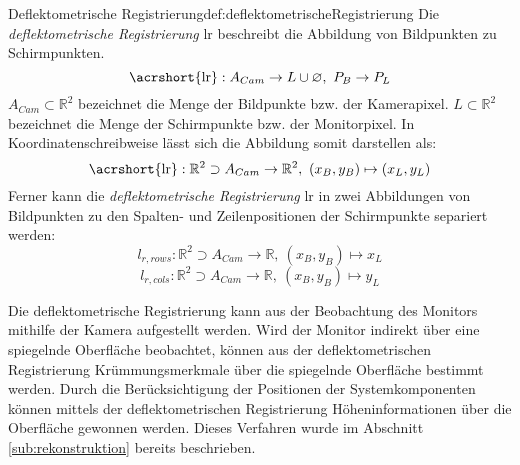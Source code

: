 \begin{Definition}{Deflektometrische Registrierung}{def:deflektometrischeRegistrierung}
	Die \textit{deflektometrische Registrierung} \acrshort{lr} beschreibt die Abbildung von Bildpunkten zu Schirmpunkten. \cite{kit_sbw}
	\begin{equation}
		\text{\acrshort{lr}} : A_{Cam} \rightarrow L \cup \varnothing ,~ P_{B} \rightarrow P_{L}
	\end{equation}
	$ A_{Cam} \subset \mathbb{R}^{2} $ bezeichnet die Menge der Bildpunkte bzw. der Kamerapixel.
	$ L \subset \mathbb{R}^{2} $ bezeichnet die Menge der Schirmpunkte bzw. der Monitorpixel.
	In Koordinatenschreibweise lässt sich die Abbildung somit darstellen als:
	\begin{equation}
		\text{\acrshort{lr}} : \mathbb{R}^{2} \supset A_{Cam} \rightarrow \mathbb{R}^2 ,~ (x_{B}, y_{B}) \mapsto (x_{L}, y_{L})
	\end{equation}
	Ferner kann die \textit{deflektometrische Registrierung} \acrshort{lr} in zwei Abbildungen von Bildpunkten zu den Spalten- und Zeilenpositionen der Schirmpunkte separiert werden:
	\begin{equation}
		l_{r,rows} : \mathbb{R}^{2} \supset A_{Cam} \rightarrow \mathbb{R} ,~ (x_{B}, y_{B}) \mapsto x_{L}
	\end{equation}
	\begin{equation}
		l_{r,cols} : \mathbb{R}^{2} \supset A_{Cam} \rightarrow \mathbb{R} ,~ (x_{B}, y_{B}) \mapsto y_{L}
	\end{equation}
\end{Definition}

\noindent
Die deflektometrische Registrierung kann aus der Beobachtung des Monitors mithilfe der Kamera aufgestellt werden.
Wird der Monitor indirekt über eine spiegelnde Oberfläche beobachtet, können aus der deflektometrischen Registrierung Krümmungsmerkmale über die spiegelnde Oberfläche bestimmt werden.
Durch die Berücksichtigung der Positionen der Systemkomponenten können mittels der deflektometrischen Registrierung Höheninformationen über die Oberfläche gewonnen werden.
Dieses Verfahren wurde im Abschnitt \ref{sub:rekonstruktion} bereits beschrieben.
